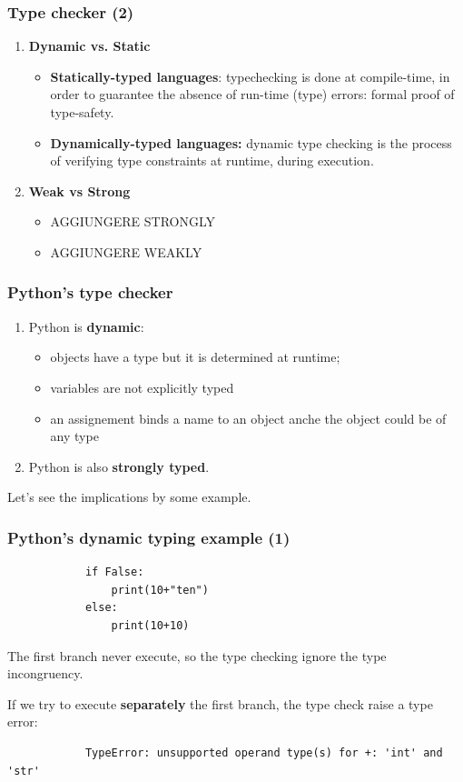 \documentclass[xcolor ={table,usenames,dvipsnames}]{beamer}
\theoremstyle{definition}
\begin{document}
	\begin{frame}
		\frametitle{Type checker (2) }
		\begin{enumerate}
			\item \textbf{Dynamic vs. Static}\begin{itemize}
				\item \textbf{Statically-typed languages}: typechecking is done at
				compile-time, in order to guarantee the absence of run-time (type) errors:
				formal proof of type-safety.
				\item \textbf{Dynamically-typed languages:} dynamic
				type checking is the process of verifying type constraints at runtime,
				during execution.
			\end{itemize}
			\item \textbf{Weak vs Strong}\begin{itemize}
				\item AGGIUNGERE STRONGLY
				\item AGGIUNGERE WEAKLY	
			\end{itemize}
		\end{enumerate}
	\end{frame}

	\begin{frame}
		\frametitle{Python's type checker}
			\begin{enumerate}
				\item Python is \textbf{dynamic}: 
				\begin{itemize}
					\item objects have a type but it is determined at runtime;
					\item variables are not explicitly typed
					\item an assignement binds a name to an object anche the object could be of any type
				\end{itemize}
				\item Python is also \textbf{strongly typed}.
			\end{enumerate}
			Let's see the implications by some example.
	\end{frame}

	\begin{frame}[fragile]
		\frametitle{Python's dynamic typing example (1)}
			\begin{lstlisting} 
			if False:
				print(10+"ten") 
			else:
				print(10+10)
			\end{lstlisting}
			The first branch never execute, so the type checking ignore the type incongruency.
			
			If we try to execute \textbf{separately} the first branch, the type check raise a type error:
			
			\begin{lstlisting}
			TypeError: unsupported operand type(s) for +: 'int' and 'str'
			\end{lstlisting}
	\end{frame}
\end{document}
